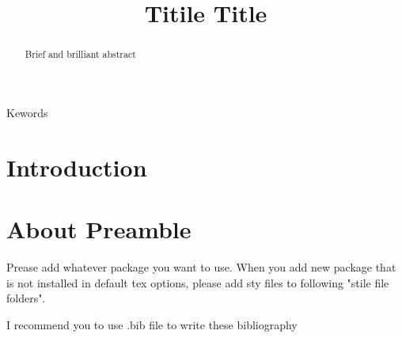 \documentclass[english,dvipdfmx]{ieej-e-samcon}
\title{Titile Title}
\begin{document}
\begin{abstract}
Brief and brilliant abstract
\end{abstract}
\begin{keyword}
Kewords
\end{keyword}
\maketitle

\section{Introduction}

\section{About Preamble}
Prease add whatever package you want to use.
When you add new package that is not installed in default tex options, please add sty files to following "stile file folders".

\begin{thebibliography}{99}
\item{} I recommend you to use .bib file to write these bibliography
\end{thebibliography}

\end{document}
